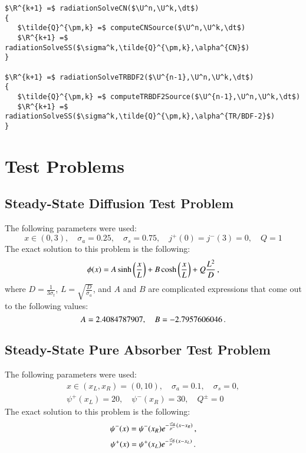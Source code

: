 \documentclass[preprint,12pt]{elsarticle}
\begin{document}
\begin{lstlisting}[mathescape,columns=fullflexible,
   basicstyle=\fontfamily{lmvtt}\selectfont]
$\R^{k+1} =$ radiationSolveCN($\U^n,\U^k,\dt$)
{
   $\tilde{Q}^{\pm,k} =$ computeCNSource($\U^n,\U^k,\dt$)
   $\R^{k+1} =$ radiationSolveSS($\sigma^k,\tilde{Q}^{\pm,k},\alpha^{CN}$)
}

$\R^{k+1} =$ radiationSolveTRBDF2($\U^{n-1},\U^n,\U^k,\dt$)
{
   $\tilde{Q}^{\pm,k} =$ computeTRBDF2Source($\U^{n-1},\U^n,\U^k,\dt$)
   $\R^{k+1} =$ radiationSolveSS($\sigma^k,\tilde{Q}^{\pm,k},\alpha^{TR/BDF-2}$)
}
\end{lstlisting}

\section{Test Problems}
\subsection{Steady-State Diffusion Test Problem}
The following parameters were used:
\[
   x\in(0,3),
   \quad \sigma_a = 0.25,
   \quad \sigma_s = 0.75,
   \quad j^+(0) = j^-(3) = 0,
   \quad Q = 1
\]
The exact solution to this problem is the following:
\[
   \phi(x) = A\sinh\left( \frac{x}{L} \right) + B\cosh\left( \frac{x}{L} \right) + Q\frac{L^2}{D} \, ,
\]
where $D=\frac{1}{3\sigma_t}$, $L=\sqrt{\frac{D}{\sigma_a}}$, and $A$ and $B$ are
complicated expressions that come out to the following values:
\[
   A=2.4084787907,\quad B=-2.7957606046 \, .
\]

\subsection{Steady-State Pure Absorber Test Problem}
The following parameters were used:
\begin{gather*}
   x\in(x_L,x_R)=(0,10),
   \quad \sigma_a = 0.1,
   \quad \sigma_s = 0,\\
   \psi^+(x_L) = 20,
   \quad \psi^-(x_R) = 30,
   \quad Q^\pm = 0
\end{gather*}
The exact solution to this problem is the following:
\[
   \psi^-(x) = \psi^-(x_R)e^{-\frac{\sigma_a}{\mu^-}\left( x-x_R \right)} \, ,
\]
\[
   \psi^+(x) = \psi^+(x_L)e^{-\frac{\sigma_a}{\mu^-}\left( x-x_L \right)} \, .
\]
\end{document}
